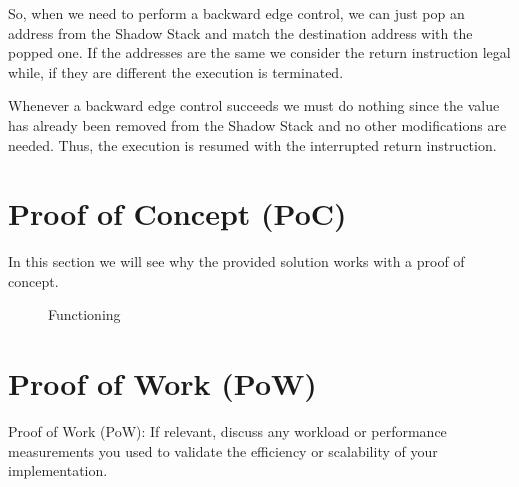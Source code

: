 So, when we need to perform a backward edge control, we can just pop an address from
the Shadow Stack and match the destination address with the popped one. If the
addresses are the same we consider the return instruction legal while, if they are
different the execution is terminated.

Whenever a backward edge control succeeds we must do nothing since the value has
already been removed from the Shadow Stack and no other modifications are needed.
Thus, the execution is resumed with the interrupted return instruction.

\section{Proof of Concept (PoC)}
\label{sec:project_poc}

In this section we will see why the provided solution works with a proof of
concept.

\begin{figure}[htbp]
  \centering
  \def\stackalignment{r} %
  {\scriptsize }
  \caption{Functioning}
  \label{fig:functioning}
\end{figure}

\section{Proof of Work (PoW)}
\label{sec:project_pow}

Proof of Work (PoW): If relevant, discuss any workload or performance
measurements you used to validate the efficiency or scalability of your
implementation.